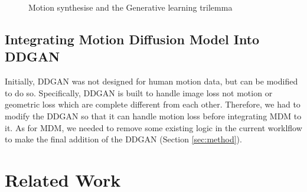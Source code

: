 \documentclass[10pt,twocolumn,letterpaper]{article}
\begin{document}
\begin{figure}[h!]    
    \centering
    \caption{Motion synthesise and the Generative learning trilemma \cite{Tevet23} \cite{Xiao22}}    
    \label{fig:intro-0}
\end{figure}

\subsection{Integrating Motion Diffusion Model Into DDGAN}

Initially, DDGAN was not designed for human motion data, but can be modified to do so. Specifically, DDGAN 
is built to handle image loss not motion or geometric loss which are complete different from each other. 
Therefore, we had to modify the DDGAN so that it can handle motion loss before integrating MDM to it. As for MDM, we needed to 
remove some existing logic in the current worklflow to make the final addition of the DDGAN (Section \ref{sec:method}). 

\section{Related Work}
\label{sec:related-work}
\end{document}
